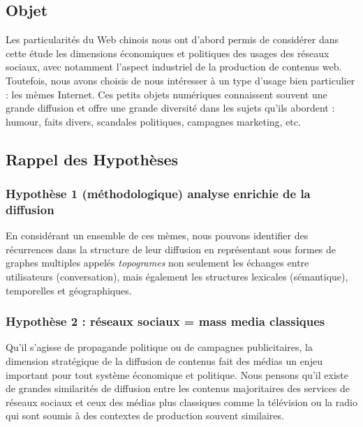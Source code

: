  
\subsection{Objet} 
Les particularit\'es du Web chinois nous ont d{\textquoteright}abord  permis de consid\'erer dans cette \'etude les dimensions \'economiques  et politiques des usages des r\'eseaux sociaux, avec notamment  l{\textquoteright}aspect industriel de la production de contenus web.  Toutefois, nous avons choisis de nous int\'eresser \`a un type  d{\textquoteright}usage bien particulier : les m\`emes Internet. Ces  petits objets num\'eriques connaissent souvent une grande diffusion et  offre une grande diversit\'e dans les sujets qu{\textquoteright}ils  abordent : humour, faits divers, scandales politiques, campagnes  marketing, etc.    


\subsection{Rappel des Hypoth\`eses}

\subsubsection{Hypoth\`ese 1 (m\'ethodologique) analyse enrichie de la diffusion} 

En consid\'erant un ensemble de ces m\`emes, nous pouvons identifier des r\'ecurrences dans la structure de leur diffusion en repr\'esentant sous formes de graphes multiples appel\'es \textit{topogrames} non seulement les \'echanges entre utilisateurs (conversation), mais \'egalement les structures lexicales (s\'emantique), temporelles et g\'eographiques.

\subsubsection{Hypoth\`ese 2 : r\'eseaux sociaux = mass media classiques} 

Qu{\textquoteright}il s{\textquoteright}agisse de propagande politique ou de campagnes publicitaires, la dimension strat\'egique de la diffusion de contenus fait des m\'edias un enjeu important pour tout syst\`eme \'economique et politique. Nous pensons qu{\textquoteright}il existe de grandes similarit\'es de diffusion entre les contenus majoritaires des services de r\'eseaux sociaux et ceux des m\'edias plus classiques comme la t\'el\'evision ou la radio qui sont soumis \`a des contextes de production souvent similaires.

